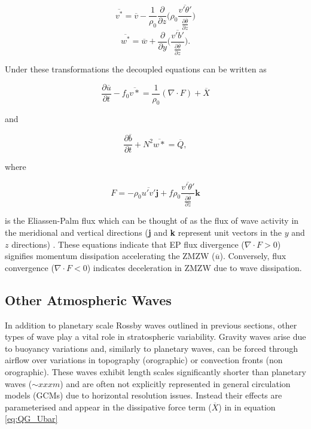\begin{equation} \label{eq:V*}
\overline{v^*} = \overline{v} - \frac{1}{\rho_0}\frac{\partial}{\partial z} \bigg(\rho_0 \frac{\overline{v'\theta'}}{\frac{\partial{\overline{\theta}}}{\partial{z}}}\bigg)
\end{equation}\break
\begin{equation} \label{eq:W*}
\overline{w^*} = \overline{w} + \frac{\partial}{\partial y} \bigg( \frac{\overline{v'b'}}{\frac{\partial{\overline{\theta}}}{\partial{z}}}\bigg).
\end{equation}


Under these transformations the decoupled equations can be written as

\begin{equation} \label{eq:decoupled_U}
\frac{\partial \overline{u}}{\partial t} - f_0 \overline{v*} = \frac{1}{\rho_0} (\nabla \cdot F) + \overline{X}
\end{equation}

and

\begin{equation} \label{eq:decoupled_b}
\frac{\partial \overline{b}}{\partial t} + N^2 \overline{w*} = \overline{Q},
\end{equation}

where

\begin{equation} \label{eq:EP_flux}
F = -\rho_0 \overline{u'v'}\textbf{j} + f\rho_0\frac{\overline{v'\theta'}}{\frac{\partial{\overline{\theta}}}{\partial{z}}} \textbf{k}
\end{equation}

is the Eliassen-Palm flux which can be thought of as the flux of wave activity in the meridional and vertical directions (\textbf{j} and \textbf{k} represent unit vectors in the $y$ and $z$ directions) \citep{Andrews1976}. These equations indicate that EP flux divergence ($\nabla \cdot F > 0$) signifies momentum dissipation accelerating the ZMZW ($\overbar{u}$). Conversely, flux convergence ($\nabla \cdot F < 0$) indicates deceleration in ZMZW due to wave dissipation.

\subsection{Other Atmospheric Waves} \label{sec:other_waves}
In addition to planetary scale Rossby waves outlined in previous sections, other types of wave play a vital role in stratospheric variability. Gravity waves arise due to buoyancy variations and, similarly to planetary waves, can be forced through airflow over variations in topography (orographic) or convection fronts (non orographic). These waves exhibit length scales significantly shorter than planetary waves ($\sim xxxm$) and are often not explicitly represented in general circulation models (GCMs) due to horizontal resolution issues. Instead their effects are parameterised and appear in the dissipative force term ($\overline{X}$) in in equation \ref{eq:QG_Ubar}

